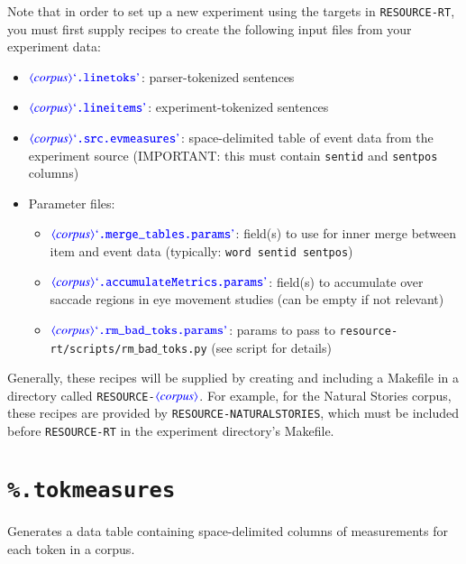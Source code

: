 \documentclass[12pt]{report}
\def\blue{\color{blue}}
\begin{document}
Note that in order to set up a new experiment using the targets in {\tt RESOURCE-RT}, you must first supply recipes to create the following input files from your experiment data:

\begin{itemize}
\item {\tt\blue $\dtype{corpus} \dcode{.linetoks}$}: parser-tokenized sentences
\item {\tt\blue $\dtype{corpus} \dcode{.lineitems}$}: experiment-tokenized sentences
\item {\tt\blue $\dtype{corpus} \dcode{.src.evmeasures}$}: space-delimited table of event data from the experiment source (IMPORTANT: this must contain {\tt\blue sentid} and {\tt\blue sentpos} columns)
\item Parameter files:
\begin{itemize}
\item {\tt\blue $\dtype{corpus} \dcode{.merge\_tables.params}$}: field(s) to use for inner merge between item and event data (typically: {\tt\blue word sentid sentpos})
\item {\tt\blue $\dtype{corpus} \dcode{.accumulateMetrics.params}$}: field(s) to accumulate over saccade regions in eye movement studies (can be empty if not relevant) 
\item {\tt\blue $\dtype{corpus} \dcode{.rm\_bad\_toks.params}$}: params to pass to {\tt\blue resource-rt/scripts/rm$\_$bad$\_$toks.py} (see script for details) 
\end{itemize}
\end{itemize}

Generally, these recipes will be supplied by creating and including a Makefile in a directory called {\tt RESOURCE-$\dtype{corpus}$}.
For example, for the Natural Stories corpus, these recipes are provided by {\tt RESOURCE-NATURALSTORIES}, which must be included before {\tt RESOURCE-RT} in the experiment directory's Makefile.

\section{{\blue\tt \%.tokmeasures}}

Generates a data table containing space-delimited columns of measurements for each token in a corpus.
\end{document}
